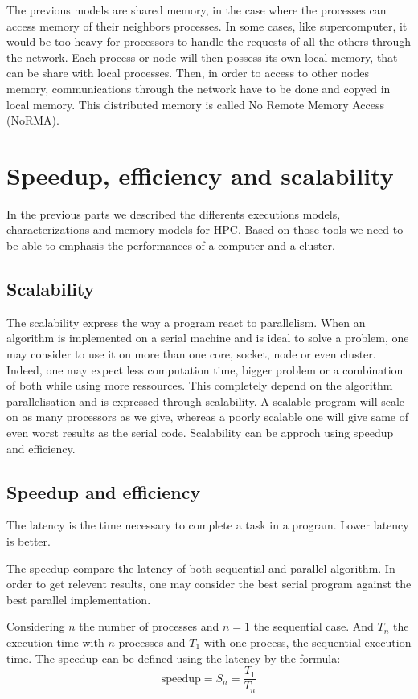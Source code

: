 The previous models are shared memory, in the case where the processes can access memory of their neighbors processes. 
In some cases, like supercomputer, it would be too heavy for processors to handle the requests of all the others through the network. 
Each process or node will then possess its own local memory, that can be share with local processes. 
Then, in order to access to other nodes memory, communications through the network have to be done and copyed in local memory. 
This distributed memory is called No Remote Memory Access (NoRMA).

\section{Speedup, efficiency and scalability}
In the previous parts we described the differents executions models, characterizations and memory models for HPC. 
Based on those tools we need to be able to emphasis the performances of a computer and a cluster. 

\subsection{Scalability}
The scalability express the way a program react to parallelism. 
When an algorithm is implemented on a serial machine and is ideal to solve a problem, one may consider to use it on more than one core, socket, node or even cluster. 
Indeed, one may expect less computation time, bigger problem or a combination of both while using more ressources. 
This completely depend on the algorithm parallelisation and is expressed through scalability. 
A scalable program will scale on as many processors as we give, whereas a poorly scalable one will give same of even worst results as the serial code.  
Scalability can be approch using speedup and efficiency.

\subsection{Speedup and efficiency}
The latency is the time necessary to complete a task in a program.
Lower latency is better. 

The speedup compare the latency of both sequential and parallel algorithm. 
In order to get relevent results, one may consider the best serial program against the best parallel implementation.

Considering $n$ the number of processes and $n=1$ the sequential case.
And $T_n$ the execution time with $n$ processes and $T_1$ with one process, the sequential execution time. 
The speedup can be defined using the latency by the formula: 
\begin{equation}
\text{speedup} = S_n =  \frac{T_1}{T_n}
\end{equation}


